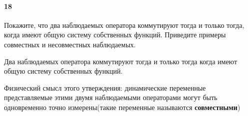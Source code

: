 



\paragraph{18}
Покажите, что два наблюдаемых оператора коммутируют тогда и только тогда, когда имеют общую систему собственных функций. Приведите примеры совместных и несовместных наблюдаемых.

\begin{theorem}
	Два наблюдаемых оператора коммутируют тогда и только тогда когда имеют общую систему собственных функций.
\end{theorem}
Физический смысл этого утверждения: динамические переменные представляемые этими двумя наблюдаемыми операторами могут быть одновременно точно измерены(такие переменные называются \textbf{совместными})\\

